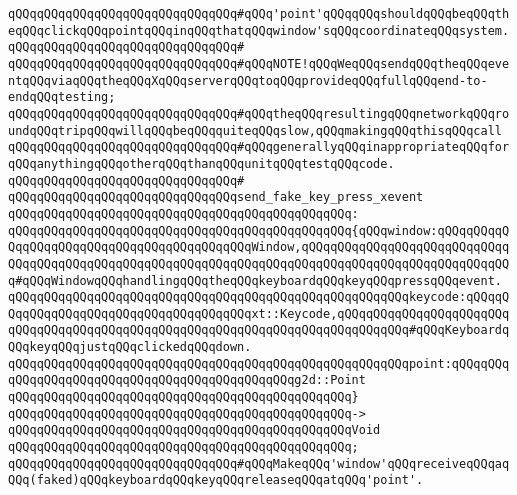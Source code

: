 \verb|qQQqqQQqqQQqqQQqqQQqqQQqqQQqqQQq#qQQq'point'qQQqqQQqshouldqQQqbeqQQqtheqQQqclickqQQqpointqQQqinqQQqthatqQQqwindow'sqQQqcoordinateqQQqsystem.|\newline
\verb|qQQqqQQqqQQqqQQqqQQqqQQqqQQqqQQq#|\newline
\verb|qQQqqQQqqQQqqQQqqQQqqQQqqQQqqQQq#qQQqNOTE!qQQqWeqQQqsendqQQqtheqQQqeventqQQqviaqQQqtheqQQqXqQQqserverqQQqtoqQQqprovideqQQqfullqQQqend-to-endqQQqtesting;|\newline
\verb|qQQqqQQqqQQqqQQqqQQqqQQqqQQqqQQq#qQQqtheqQQqresultingqQQqnetworkqQQqroundqQQqtripqQQqwillqQQqbeqQQqquiteqQQqslow,qQQqmakingqQQqthisqQQqcall|\newline
\verb|qQQqqQQqqQQqqQQqqQQqqQQqqQQqqQQq#qQQqgenerallyqQQqinappropriateqQQqforqQQqanythingqQQqotherqQQqthanqQQqunitqQQqtestqQQqcode.|\newline
\verb|qQQqqQQqqQQqqQQqqQQqqQQqqQQqqQQq#|\newline
\verb|qQQqqQQqqQQqqQQqqQQqqQQqqQQqqQQqsend_fake_key_press_xevent|\newline
\verb|qQQqqQQqqQQqqQQqqQQqqQQqqQQqqQQqqQQqqQQqqQQqqQQq:|\newline
\verb|qQQqqQQqqQQqqQQqqQQqqQQqqQQqqQQqqQQqqQQqqQQqqQQq{qQQqwindow:qQQqqQQqqQQqqQQqqQQqqQQqqQQqqQQqqQQqqQQqqQQqWindow,qQQqqQQqqQQqqQQqqQQqqQQqqQQqqQQqqQQqqQQqqQQqqQQqqQQqqQQqqQQqqQQqqQQqqQQqqQQqqQQqqQQqqQQqqQQqqQQqqQQq#qQQqWindowqQQqhandlingqQQqtheqQQqkeyboardqQQqkeyqQQqpressqQQqevent.|\newline
\verb|qQQqqQQqqQQqqQQqqQQqqQQqqQQqqQQqqQQqqQQqqQQqqQQqqQQqqQQqkeycode:qQQqqQQqqQQqqQQqqQQqqQQqqQQqqQQqqQQqqQQqxt::Keycode,qQQqqQQqqQQqqQQqqQQqqQQqqQQqqQQqqQQqqQQqqQQqqQQqqQQqqQQqqQQqqQQqqQQqqQQqqQQqqQQq#qQQqKeyboardqQQqkeyqQQqjustqQQqclickedqQQqdown.|\newline
\verb|qQQqqQQqqQQqqQQqqQQqqQQqqQQqqQQqqQQqqQQqqQQqqQQqqQQqqQQqpoint:qQQqqQQqqQQqqQQqqQQqqQQqqQQqqQQqqQQqqQQqqQQqqQQqg2d::Point|\newline
\verb|qQQqqQQqqQQqqQQqqQQqqQQqqQQqqQQqqQQqqQQqqQQqqQQq}|\newline
\verb|qQQqqQQqqQQqqQQqqQQqqQQqqQQqqQQqqQQqqQQqqQQqqQQq->|\newline
\verb|qQQqqQQqqQQqqQQqqQQqqQQqqQQqqQQqqQQqqQQqqQQqqQQqVoid|\newline
\verb|qQQqqQQqqQQqqQQqqQQqqQQqqQQqqQQqqQQqqQQqqQQqqQQq;|\newline
\newline
\verb|qQQqqQQqqQQqqQQqqQQqqQQqqQQqqQQq#qQQqMakeqQQq'window'qQQqreceiveqQQqaqQQq(faked)qQQqkeyboardqQQqkeyqQQqreleaseqQQqatqQQq'point'.|\newline
